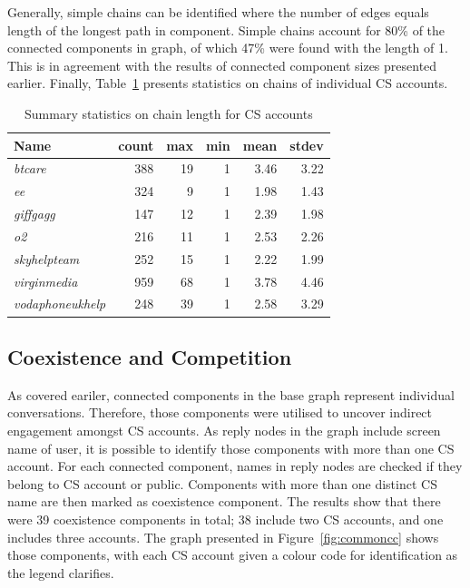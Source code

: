 \documentclass[sigconf]{acmart}
\begin{document}
{Generally, simple chains can be identified where the number of edges
equals length of the longest path in component. Simple chains account
for 80\% of the connected components in graph, of which 47\% were
found with the length of 1. This is in agreement with the results of
connected component sizes presented earlier. Finally,
Table~\ref{tbl:delaystatscl} presents statistics on chains of
individual CS accounts.


\begin{table}[!h]
\centering
\begin{tabularx}{\columnwidth}{lrrrrr}
\toprule
\textbf{Name} & \textbf{count} & \textbf{max} & \textbf{min} & \textbf{mean} & \textbf{stdev}\\ 
\midrule
{\emph{btcare}} & 388 & 19 & 1 & 3.46 & 3.22\\
{\emph{ee}} & 324 & 9 & 1 & 1.98 & 1.43\\
{\emph{giffgagg}} & 147 & 12 & 1 & 2.39 & 1.98\\ 
{\emph{o2}} & 216 & 11 & 1 & 2.53 & 2.26\\
{\emph{skyhelpteam}} & 252 & 15 & 1 & 2.22 & 1.99\\
{\emph{virginmedia}} & 959 & 68 & 1 & 3.78 & 4.46\\
{\emph{vodaphoneukhelp}} & 248 & 39 & 1 & 2.58 & 3.29\\
\bottomrule
\end{tabularx}
\caption{Summary statistics on chain length for CS accounts}
\label{tbl:delaystatscl}
\end{table}

\subsection{Coexistence and Competition}

As covered eariler, connected components in the base graph represent 
individual conversations. Therefore, those components were utilised to uncover 
indirect engagement amongst CS accounts. As reply nodes in the graph include 
screen name of user, it is possible to identify those components with 
more than one CS account. For each connected component, names in reply nodes
are checked if they belong to CS account or public. Components with more than
one distinct CS name are then marked as coexistence component. The results show
that there were 39 coexistence components in total; 38 include two CS accounts, and one
includes three accounts. The graph presented in
Figure~\ref{fig:commoncc} shows those components, with each CS account
given a colour code for identification as the legend clarifies.

}
\end{document}
